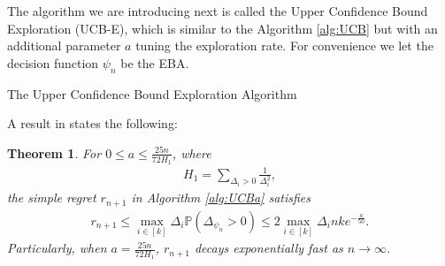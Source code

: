 \documentclass[letterpaper,11pt,openright,openany]{book}
\numberwithin{equation}{section}
\theoremstyle{plain}
\newtheorem{Th}{Theorem}[section]
\theoremstyle{definition}
\def\P{{\mathbb P}}
\DeclareMathOperator*{\argmax}{arg\,max}
\begin{document}
The algorithm we are introducing next is called the Upper Confidence Bound Exploration (UCB-E), which is similar to the Algorithm \ref{alg:UCB} but with an additional parameter $a$ tuning the exploration rate. For convenience we let the decision function $\psi_n$ be the EBA.  

\begin{algorithm}[H]
 \begin{algorithmic}[1]
\ENDWHILE
\STATE{$\psi_n = \argmax_{i\in [k]}\hat{\mu}_i(n)$} 
\end{algorithmic}
\caption{The Upper Confidence Bound Exploration Algorithm } 
\label{alg:UCBa}
\end{algorithm}

A result in \cite{audibert2010best} states the following:
\begin{Th}\label{thm:UCBa}
For $0\leq a\leq \frac{25n}{72H_1}$, where 
\begin{align*}
H_1=\sum_{\Delta_i>0}\frac{1}{\Delta_i^2},
\end{align*}
the simple regret $r_{n+1}$ in Algorithm \ref{alg:UCBa} satisfies
\begin{align*}
r_{n+1}\leq\max_{i\in [k]}\Delta_i\P\left(\Delta_{\psi_{n}}>0\right) \leq 2\max_{i\in [k]}\Delta_i nk e^{-\frac{a}{50}}. 
\end{align*}
Particularly, when $a=\frac{25n}{72H_1}$, $r_{n+1}$ decays exponentially fast as $n\to\infty$. 
\end{Th}
\end{document}
